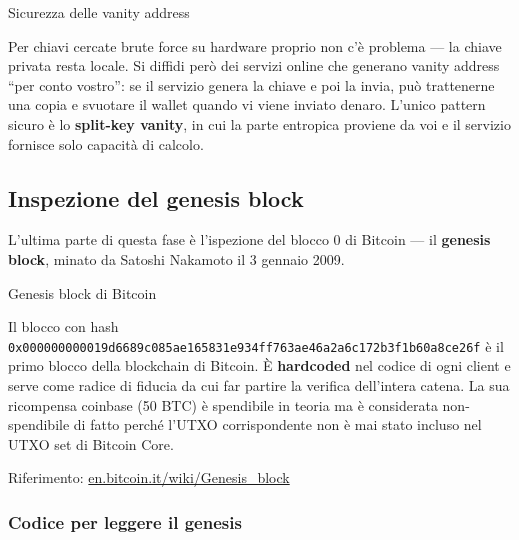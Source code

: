\documentclass[
  italian,
  openany]{book}
\begin{document}
\begin{calloutwarning}{Sicurezza delle vanity address}

Per chiavi cercate brute force su hardware proprio non c'è problema ---
la chiave privata resta locale. Si diffidi però dei servizi online che
generano vanity address ``per conto vostro'': se il servizio genera la
chiave e poi la invia, può trattenerne una copia e svuotare il wallet
quando vi viene inviato denaro. L'unico pattern sicuro è lo
\textbf{split-key vanity}, in cui la parte entropica proviene da voi e
il servizio fornisce solo capacità di calcolo.

\end{calloutwarning}

\subsection{Inspezione del genesis
block}\label{inspezione-del-genesis-block}

L'ultima parte di questa fase è l'ispezione del blocco 0 di Bitcoin ---
il \textbf{genesis block}, minato da Satoshi Nakamoto il 3 gennaio 2009.

\begin{calloutdefinition}{Genesis block di Bitcoin}

Il blocco con hash
\texttt{0x000000000019d6689c085ae165831e934ff763ae46a2a6c172b3f1b60a8ce26f}
è il primo blocco della blockchain di Bitcoin. È \textbf{hardcoded} nel
codice di ogni client e serve come radice di fiducia da cui far partire
la verifica dell'intera catena. La sua ricompensa coinbase (50 BTC) è
spendibile in teoria ma è considerata non-spendibile di fatto perché
l'UTXO corrispondente non è mai stato incluso nel UTXO set di Bitcoin
Core.

Riferimento:
\href{https://en.bitcoin.it/wiki/Genesis_block}{en.bitcoin.it/wiki/Genesis\_block}

\end{calloutdefinition}

\subsubsection{Codice per leggere il
genesis}\label{codice-per-leggere-il-genesis}
\end{document}
